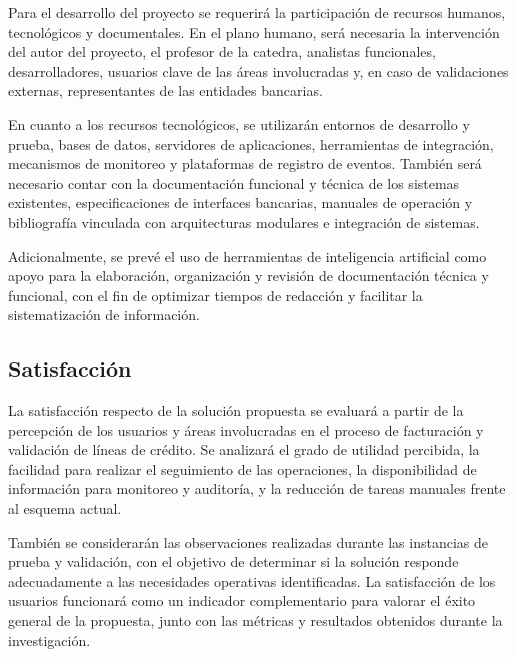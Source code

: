 Para el desarrollo del proyecto se requerirá la participación de recursos humanos, tecnológicos y documentales. En el plano humano, será necesaria la intervención del autor del proyecto, el profesor de la catedra, analistas funcionales, desarrolladores, usuarios clave de las áreas involucradas y, en caso de validaciones externas, representantes de las entidades bancarias.

En cuanto a los recursos tecnológicos, se utilizarán entornos de desarrollo y prueba, bases de datos, servidores de aplicaciones, herramientas de integración, mecanismos de monitoreo y plataformas de registro de eventos. También será necesario contar con la documentación funcional y técnica de los sistemas existentes, especificaciones de interfaces bancarias, manuales de operación y bibliografía vinculada con arquitecturas modulares e integración de sistemas.

Adicionalmente, se prevé el uso de herramientas de inteligencia artificial como apoyo para la elaboración, organización y revisión de documentación técnica y funcional, con el fin de optimizar tiempos de redacción y facilitar la sistematización de información.

\subsection{Satisfacción}

La satisfacción respecto de la solución propuesta se evaluará a partir de la percepción de los usuarios y áreas involucradas en el proceso de facturación y validación de líneas de crédito. Se analizará el grado de utilidad percibida, la facilidad para realizar el seguimiento de las operaciones, la disponibilidad de información para monitoreo y auditoría, y la reducción de tareas manuales frente al esquema actual.

También se considerarán las observaciones realizadas durante las instancias de prueba y validación, con el objetivo de determinar si la solución responde adecuadamente a las necesidades operativas identificadas. La satisfacción de los usuarios funcionará como un indicador complementario para valorar el éxito general de la propuesta, junto con las métricas y resultados obtenidos durante la investigación.
